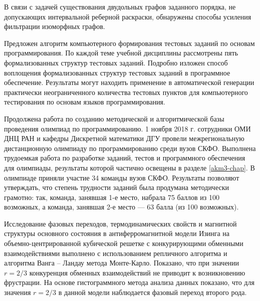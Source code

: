 В связи с задачей существования двудольных графов заданного порядка, не допускающих интервальной реберной раскраски,
обнаружены способы усиления фильтрации изоморфных графов.




Предложен алгоритм компьютерного формирования тестовых заданий по основам программирования.
По каждой теме учебной дисциплины рассмотрены пять формализованных структур тестовых заданий.
Подробно изложен способ воплощения формализованных структур тестовых заданий в программное обеспечение.
Результаты могут находить применение в автоматической генерации практически неограниченного количества тестовых пунктов для компьютерного тестирования по основам языков программирования.

Продолжена работа по созданию методической и алгоритмической базы проведения олимпиад по программированию.
1 ноября 2018 г. сотрудники ОМИ ДНЦ РАН и кафедры Дискретной математики ДГУ провели  межрегиональную дистанционную олимпиаду по программированию среди вузов СКФО.
Выполнена трудоемкая работа по разработке заданий, тестов и программного обеспечения для олимпиады, результаты которой частично освещены в разделе \ref{akm3-chap}.
%
В олимпиаде приняли участие 34 команды вузов СКФО. Результаты позволяют утверждать, что степень трудности заданий была продумана методически грамотно: так, команда, занявшая 1-е место, набрала 75 баллов из 100 возможных, а команда, занявшая 2-е место --- 63 балла (из 100 возможных).








Исследование фазовых переходов, термодинамических свойств и магнитной \linebreak структуры основного состояния в антиферромагнитной модели Изинга на объемно-центрированной кубической решетке с конкурирующими обменными взаимодействиями выполнено с использованием репличного алгоритма и алгоритма Ванга -- Ландау метода Монте-Карло. Показано, что при значении $r=2/3$ конкуренция обменных взаимодействий не приводит к возникновению фрустрации. На основе гистограммного метода анализа данных показано, что для значения $r=2/3$ в данной модели наблюдается фазовый переход второго рода.



